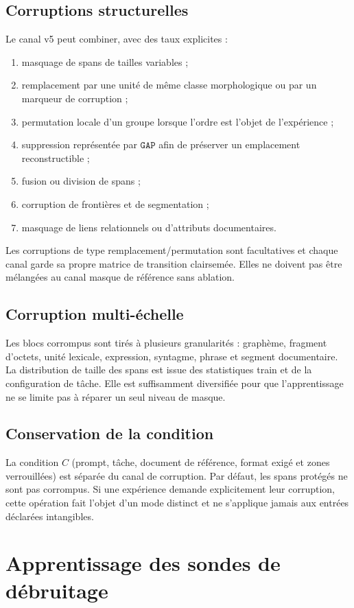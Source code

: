 \documentclass[11pt,a4paper,oneside]{report}
\newcommand{\Gap}{\mathtt{GAP}}
\begin{document}
\section{Corruptions structurelles}
Le canal v5 peut combiner, avec des taux explicites :
\begin{enumerate}
\item masquage de spans de tailles variables ;
\item remplacement par une unité de même classe morphologique ou par un marqueur de corruption ;
\item permutation locale d'un groupe lorsque l'ordre est l'objet de l'expérience ;
\item suppression représentée par $\Gap$ afin de préserver un emplacement reconstructible ;
\item fusion ou division de spans ;
\item corruption de frontières et de segmentation ;
\item masquage de liens relationnels ou d'attributs documentaires.
\end{enumerate}
Les corruptions de type remplacement/permutation sont facultatives et chaque canal garde sa propre matrice de transition clairsemée. Elles ne doivent pas être mélangées au canal masque de référence sans ablation.

\section{Corruption multi-échelle}
Les blocs corrompus sont tirés à plusieurs granularités : graphème, fragment d'octets, unité lexicale, expression, syntagme, phrase et segment documentaire. La distribution de taille des spans est issue des statistiques train et de la configuration de tâche. Elle est suffisamment diversifiée pour que l'apprentissage ne se limite pas à réparer un seul niveau de masque.

\section{Conservation de la condition}
La condition $C$ (prompt, tâche, document de référence, format exigé et zones verrouillées) est séparée du canal de corruption. Par défaut, les spans protégés ne sont pas corrompus. Si une expérience demande explicitement leur corruption, cette opération fait l'objet d'un mode distinct et ne s'applique jamais aux entrées déclarées intangibles.

\chapter{Apprentissage des sondes de débruitage}
\end{document}
